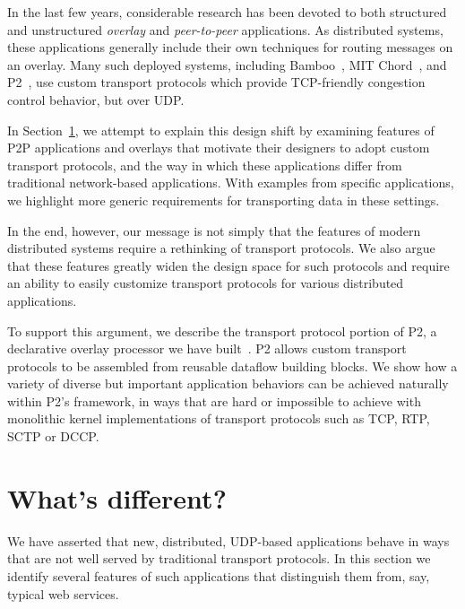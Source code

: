 
In the last few years,
considerable research has been devoted to both structured and
unstructured \emph{overlay} and \emph{peer-to-peer} applications.  As
distributed systems, these applications generally include their own
techniques for routing messages on an overlay.   Many such deployed
systems, including Bamboo~\cite{rhea_usenix_2004}, MIT
Chord~\cite{chord}, and P2~\cite{p2:sosp}, use custom transport protocols which provide
 TCP-friendly congestion control behavior, but over UDP.

In Section~\ref{sec:whatsdifferent}, we attempt to explain this design
shift by 
examining features of P2P applications and overlays that
motivate their designers to adopt custom transport protocols, and the
way in which these applications differ from traditional network-based
applications.  With examples from specific applications, we
highlight more generic requirements for transporting data in these
settings.

  In the
end, however, our message is not simply that the features of modern
distributed systems require a rethinking of transport protocols.  We
also argue that these features greatly widen the design space for such
protocols and require an ability to easily customize transport
protocols for various distributed applications.  

To support this argument, we describe the transport protocol portion
of P2, a declarative overlay processor we have built~\cite{p2:sosp}.
P2 allows custom transport protocols to be assembled
from reusable dataflow building blocks. We show how a
variety of diverse but important application behaviors can be 
achieved naturally within P2's framework, in ways that are hard
or impossible to achieve with monolithic kernel implementations of
transport protocols such as TCP, RTP, SCTP or DCCP. 

\section{What's different?}
\label{sec:whatsdifferent}

We have asserted that new, distributed, UDP-based applications behave
in ways that are not well served by traditional transport protocols.
In this section we identify several
features of such applications that distinguish them from, say, typical
web services.   

